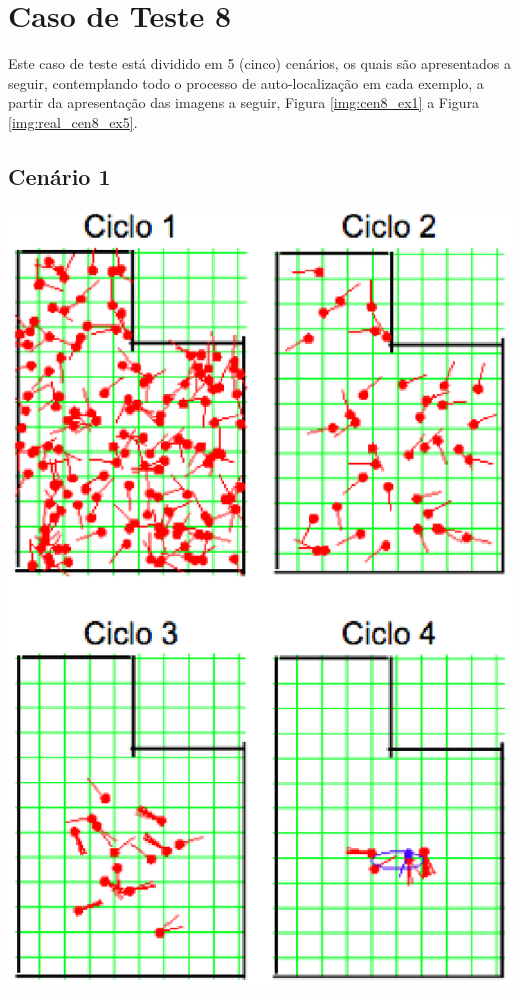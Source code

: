 \section{Caso de Teste 8}
\label{sec:cenario8}

Este caso de teste está dividido em 5 (cinco) cenários, os quais são apresentados a seguir, contemplando todo o processo de auto-localização
em cada exemplo, a partir da apresentação das imagens a seguir, Figura \ref{img:cen8_ex1} a Figura \ref{img:real_cen8_ex5}.

\subsection{Cenário 1}

{\centering
\includegraphics[scale=0.4]{figuras/cen8_ex1.eps}
\label{img:cen8_ex1}
\par}

